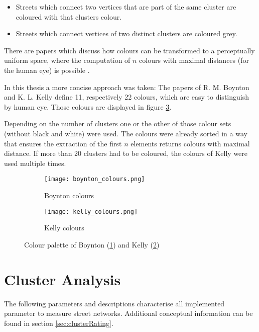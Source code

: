 \begin{itemize}
    \item Streets which connect two vertices that are part of the same cluster are coloured with that clusters colour.
    \item Streets which connect vertices of two distinct clusters are coloured grey.
\end{itemize}

There are papers which discuss how colours can be transformed to a perceptually uniform space, where the computation of $n$ colours with maximal distances (for the human eye) is possible \cite{colors:2006}.

In this thesis a more concise approach was taken: The papers of R. M. Boynton \cite{boynton:1989} and K. L. Kelly \cite{kelly:1965} define 11, respectively 22 colours, which are easy to distinguish by human eye. Those colours are displayed in figure \ref{fig:colours}.

Depending on the number of clusters one or the other of those colour sets (without black and white) were used. The colours were already sorted in a way that ensures the extraction of the first $n$ elements returns colours with maximal distance. If more than 20 clusters had to be coloured, the colours of Kelly were used multiple times.

\begin{figure}
    \centering
    \begin{subfigure}[b]{\textwidth}
        \begin{mdframed}[style=mdthight]
            \texttt{[image: boynton\_colours.png]}
        \end{mdframed}
        \caption{Boynton colours}
        \label{fig:boynton_colours}
    \end{subfigure}
    \par\medskip
    \begin{subfigure}[b]{\textwidth}
        \begin{mdframed}[style=mdthight]
            \texttt{[image: kelly\_colours.png]}
        \end{mdframed}
        \caption{Kelly colours}
        \label{fig:kelly_colurs}
    \end{subfigure}
    \caption{Colour palette of Boynton (\ref{fig:boynton_colours}) and Kelly (\ref{fig:kelly_colurs})}
    \label{fig:colours}
\end{figure}

\FloatBarrier
\pagebreak
\section{Cluster Analysis}
\label{sec:cluster_analysis_impl}
The following parameters and descriptions characterise all implemented parameter to measure street networks. Additional conceptual information can be found in section \ref{sec:clusterRating}.

